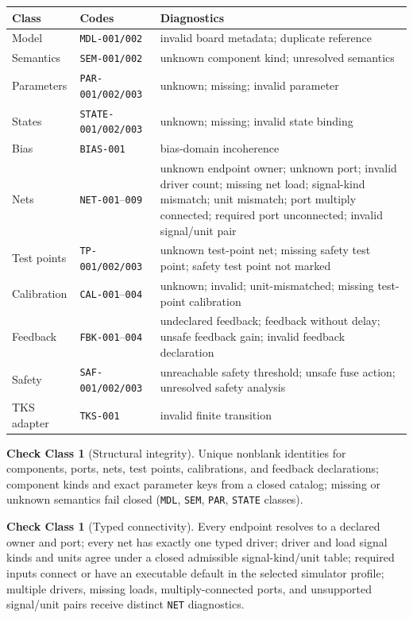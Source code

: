 \documentclass[11pt]{amsart}
\theoremstyle{definition}
\newtheorem{checkclass}[theorem]{Check Class}
\theoremstyle{remark}
\begin{document}
\begin{center}
\small
\begin{tabular}{@{}lll@{}}
\toprule
Class & Codes & Diagnostics \\
\midrule
Model & \texttt{MDL-001/002} & invalid board metadata; duplicate reference \\
Semantics & \texttt{SEM-001/002} & unknown component kind; unresolved semantics \\
Parameters & \texttt{PAR-001/002/003} & unknown; missing; invalid parameter \\
States & \texttt{STATE-001/002/003} & unknown; missing; invalid state binding \\
Bias & \texttt{BIAS-001} & bias-domain incoherence \\
Nets & \texttt{NET-001}--\texttt{009} & unknown endpoint owner; unknown port; invalid driver count; missing net load; signal-kind mismatch; unit mismatch; port multiply connected; required port unconnected; invalid signal/unit pair \\
Test points & \texttt{TP-001/002/003} & unknown test-point net; missing safety test point; safety test point not marked \\
Calibration & \texttt{CAL-001}--\texttt{004} & unknown; invalid; unit-mismatched; missing test-point calibration \\
Feedback & \texttt{FBK-001}--\texttt{004} & undeclared feedback; feedback without delay; unsafe feedback gain; invalid feedback declaration \\
Safety & \texttt{SAF-001/002/003} & unreachable safety threshold; unsafe fuse action; unresolved safety analysis \\
TKS adapter & \texttt{TKS-001} & invalid finite transition \\
\bottomrule
\end{tabular}
\end{center}

\begin{checkclass}[Structural integrity]
Unique nonblank identities for components, ports, nets, test points, calibrations, and feedback declarations; component kinds and exact parameter keys from a closed catalog; missing or unknown semantics fail closed (\texttt{MDL}, \texttt{SEM}, \texttt{PAR}, \texttt{STATE} classes).
\end{checkclass}

\begin{checkclass}[Typed connectivity]
Every endpoint resolves to a declared owner and port; every net has exactly one typed driver; driver and load signal kinds and units agree under a closed admissible signal-kind/unit table; required inputs connect or have an executable default in the selected simulator profile; multiple drivers, missing loads, multiply-connected ports, and unsupported signal/unit pairs receive distinct \texttt{NET} diagnostics.
\end{checkclass}
\end{document}
